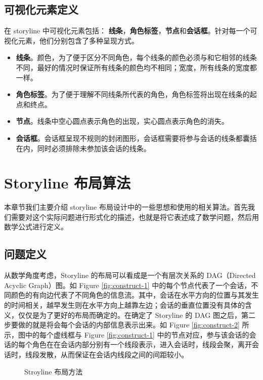 \subsection{可视化元素定义}
在 storyline 中可视化元素包括： \textbf{线条}，\textbf{角色标签}，\textbf{节点}和\textbf{会话框}。针对每一个可视化元素，他们分别包含了多种呈现方式。
\begin{itemize}
\item \textbf{线条}。颜色，为了便于区分不同角色，每个线条的颜色必须与和它相邻的线条不同，最好的情况时保证所有线条的颜色均不相同；宽度，所有线条的宽度都一样。
\item \textbf{角色标签}。为了便于理解不同线条所代表的角色，角色标签将出现在线条的起点和终点。
\item \textbf{节点}。线条中空心圆点表示角色的出现，实心圆点表示角色的消失。
\item \textbf{会话框}。会话框呈现不规则的封闭图形，会话框需要将参与会话的线条都囊括在内，同时必须排除未参加该会话的线条。
\end{itemize}

\section{Storyline 布局算法}
本章节我们主要介绍 storyline 布局设计中的一些思想和使用的相关算法。首先我们需要对这个实际问题进行形式化的描述，也就是将它表述成了数学问题，然后用数学公式进行定义。
\subsection{问题定义}
\label{section:problem-definition}
 从数学角度考虑，Storyline 的布局可以看成是一个有层次关系的 DAG（Directed Acyclic Graph）图。如 Figure \ref{fig:construct-1} 中的每个节点代表了一个会话，不同颜色的有向边代表了不同角色的信息流。其中，会话在水平方向的位置与其发生的时间相关，越早发生则在水平方向上越靠左边；会话的垂直位置没有具体的含义，仅仅是为了更好的布局而确定的。在确定了 Storyline 的 DAG 图之后，第二步要做的就是将会每个会话的内部信息表示出来。如 Figure \ref{fig:construct-2} 所示，图中的每个虚线框与 Figure \ref{fig:construct-1} 中的节点对应，参与该会话的会话的每个角色在在会话内部分别有一个线段表示，进入会话时，线段会聚，离开会话时，线段发散，从而保证在会话内线段之间的间距较小。
\begin{figure}[htb]
	\centering
	\caption{Stroyline 布局方法}
	\label{fig:storyline-dag}
\end{figure}

